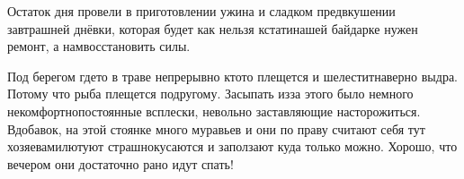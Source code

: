 Остаток дня провели в приготовлении ужина и сладком предвкушении завтрашней днёвки, которая будет как нельзя кстати\mdash нашей байдарке нужен ремонт, а нам\mdash восстановить силы. 

Под берегом где\sdash то в траве непрерывно кто\sdash то плещется и шелестит\mdash наверно выдра. Потому что рыба плещется по\sdash другому. Засыпать из\sdash за этого было немного некомфортно\mdash постоянные всплески, невольно заставляющие насторожиться. Вдобавок, на этой стоянке много муравьев и они по праву считают себя тут хозяевами\mdash лютуют страшно\mdash кусаются и заползают куда только можно. Хорошо, что вечером они достаточно рано идут спать!

\begin{center}
\end{center}
